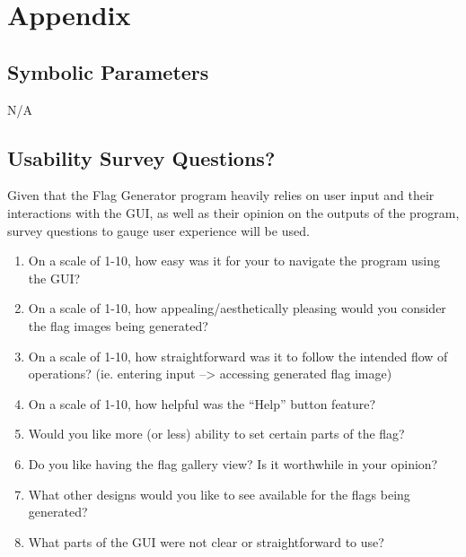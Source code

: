\documentclass[12pt, titlepage]{article}
\begin{document}
\newpage

\section{Appendix}

\subsection{Symbolic Parameters}
N/A


\subsection{Usability Survey Questions?}

Given that the Flag Generator program heavily relies on user input and their
interactions with the GUI, as well as their opinion on the outputs of the
program, survey questions to gauge user experience will be used.

\begin{enumerate}
    \item On a scale of 1-10, how easy was it for your to navigate the program
    using the GUI?
    \item On a scale of 1-10, how appealing/aesthetically pleasing would you
    consider the flag images being generated?
    \item On a scale of 1-10, how straightforward was it to follow the
    intended flow of operations? (ie. entering input --> accessing generated
    flag image)
    \item On a scale of 1-10, how helpful was the ``Help'' button feature?
    \item Would you like more (or less) ability to set certain parts of the
    flag?
    \item Do you like having the flag gallery view? Is it worthwhile in your
    opinion?
    \item What other designs would you like to see available for the flags
    being generated?
    \item What parts of the GUI were not clear or straightforward to use?
\end{enumerate}
\end{document}
